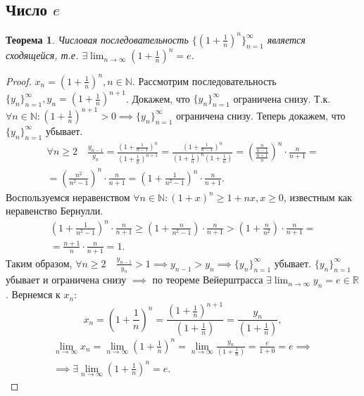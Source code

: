 \documentclass[a4paper,12pt]{article} %
\newtheorem{theorem}{Теорема}[section]
\theoremstyle{remark}
\theoremstyle{definition}
\begin{document}
\subsection{Число $e$}
\begin{theorem}
	Числовая последовательность $\{(1+\frac{1}{n})^{n}\}_{n=1}^{\infty}$ является сходящейся, т.е. $\exists \lim_{n \to \infty} (1+\frac{1}{n})^{n} = e$.
\end{theorem}
\begin{proof}
	$x_{n}=(1+\frac{1}{n})^{n}, n\in \mathbb{N}$. Рассмотрим последовательность  $\{y_n\}_{n=1}^{\infty}, y_{n} = (1+\frac{1}{n})^{n+1}$. Докажем,  что $\{y_n\}_{n=1}^{\infty}$ ограничена снизу. Т.к. $\forall n\in \mathbb{N} : (1+\frac{1}{n})^{n+1}>0 \implies \{y_n\}_{n=1}^{\infty}$ ограничена снизу. Теперь докажем, что $\{y_{n}\}_{n=1}^{\infty}$ убывает.
	\begin{multline}
		\forall n\ge 2 \quad \frac{y_{n-1}}{y_{n}} = \frac{(1+\frac{1}{n-1})^{n}}{(1+\frac{1}{n})^{n+1}} =
        \frac{(1+\frac{1}{n-1})^{n}}{(1+\frac{1}{n})^{n}(1+\frac{1}{n})}=
        \left(\frac{\frac{n}{n-1}}{\frac{n+1}{n}}\right)^{n} \cdot \frac{n}{n+1} = \\
		= \left(\frac{n^2}{n^2-1}\right)^{n} \cdot \frac{n}{n+1} = \left(1 + \frac{1}{n^2-1}\right)^{n} \cdot \frac{n}{n+1}.
	\end{multline}
	Воспользуемся неравенством $\forall n\in \mathbb{N} : (1+x)^{n} \ge 1+nx, x\ge 0$, известным как неравенство Бернулли.
	\begin{multline}
		\left(1 + \frac{1}{n^2-1}\right)^{n} \cdot \frac{n}{n+1} \ge \left(1+ \frac{n}{n^2-1}\right) \cdot  \frac{n}{n+1} >
        \left(1 + \frac{n}{n^2}\right) \cdot \frac{n}{n+1} = \\
		= \frac{n+1}{n} \cdot \frac{n}{n+1} = 1.
	\end{multline}
	Таким образом, $\forall n\ge 2 \quad \frac{y_{n-1}}{y_{n}} > 1 \implies y_{n-1} > y_{n} \implies \{y_n\}_{n=1}^{\infty}$ убывает. $\{y_n\}_{n=1}^{\infty}$ убывает и ограничена снизу $\implies$ по теореме Вейерштрасса $\exists \lim_{n \to \infty} y_n = e \in \mathbb{R}$. Вернемся к $x_n $:
	\[
		x_n = \left(1+\frac{1}{n}\right)^{n} = \frac{\left(1 + \frac{1}{n}\right)^{n+1}}{\left(1 + \frac{1}{n}\right)} = \frac{y_n}{\left(1 + \frac{1}{n}\right)} 
	,\] 
	\begin{multline}
	\lim_{n \to \infty} x_n = \lim_{n \to \infty} \left(1+\frac{1}{n}\right)^{n} = \lim_{n \to \infty} \frac{y_n}{\left(1 + \frac{1}{n}\right)} = \frac{e}{1 + 0} = e \implies \\
	\implies \exists \lim_{n \to \infty} \left(1 + \frac{1}{n}\right)^{n} = e.
	\end{multline}
	
\end{proof}
\end{document}
